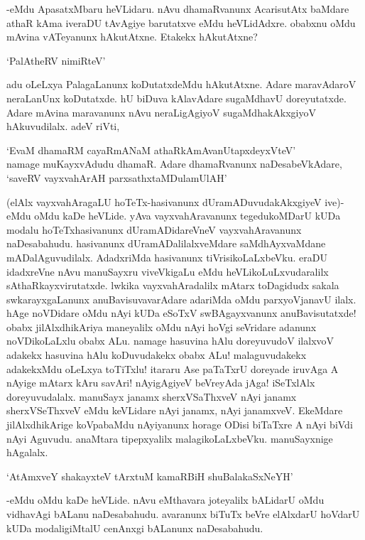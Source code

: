 -eMdu ApasatxMbaru heVLidaru. nAvu dhamaRvanunx AcarisutAtx baMdare athaR kAma iveraDU tAvAgiye barutatxve eMdu heVLidAdxre. obabxnu oMdu mAvina vATeyanunx hAkutAtxne. Etakekx hAkutAtxne?

\begin{shloka}
`PalAtheRV nimiRteV'
\end{shloka}

adu oLeLxya PalagaLanunx koDutatxdeMdu hAkutAtxne. Adare maravAdaroV neraLanUnx koDutatxde. hU biDuva kAlavAdare sugaMdhavU doreyutatxde. Adare mAvina maravanunx nAvu neraLigAgiyoV sugaMdhakAkxgiyoV hAkuvudilalx. adeV riVti,

\begin{shloka}
`EvaM dhamaRM cayaRmANaM athaRkAmAvanUtapxdeyxVteV'\\
namage muKayxvAdudu dhamaR. Adare dhamaRvanunx naDesabeVkAdare,\\
`saveRV vayxvahArAH parxsathxtaMDulamUlAH'
\end{shloka}

(elAlx vayxvahAragaLU hoTeTx-hasivanunx dUramADuvudakAkxgiyeV ive)- eMdu oMdu kaDe heVLide. yAva vayxvahAravanunx tegedukoMDarU kUDa modalu hoTeTxhasivanunx dUramADidareVneV vayxvahAravanunx naDesabahudu. hasivanunx dUramADalilalxveMdare saMdhAyxvaMdane mADalAguvudilalx. AdadxriMda hasivanunx tiVrisikoLaLxbeVku. eraDU idadxreVne nAvu manuSayxru viveVkigaLu eMdu heVLikoLuLxvudaralilx sAthaRkayxvirutatxde. lwkika vayxvahAradalilx mAtarx toDagidudx sakala swkarayxgaLanunx anuBavisuvavarAdare adariMda oMdu parxyoVjanavU ilalx. hAge noVDidare oMdu nAyi kUDa eSoTxV swBAgayxvanunx anuBavisutatxde! obabx jilAlxdhikAriya maneyalilx oMdu nAyi hoVgi seVridare adanunx noVDikoLaLxlu obabx ALu. namage hasuvina hAlu doreyuvudoV ilalxvoV adakekx hasuvina hAlu koDuvudakekx obabx ALu! malaguvudakekx adakekxMdu oLeLxya toTiTxlu! itararu Ase paTaTxrU doreyade iruvAga A nAyige mAtarx kAru savAri! nAyigAgiyeV beVreyAda jAga! iSeTxlAlx doreyuvudalalx. manuSayx janamx sherxVSaThxveV nAyi janamx sherxVSeThxveV eMdu keVLidare nAyi janamx, nAyi janamxveV. EkeMdare jilAlxdhikArige koVpabaMdu nAyiyanunx horage ODisi biTaTxre A nAyi biVdi nAyi Aguvudu. anaMtara tipepxyalilx malagikoLaLxbeVku. manuSayxnige hAgalalx.

\begin{shloka}
`AtAmxveY shakayxteV tArxtuM kamaRBiH shuBalakaSxNeYH'
\end{shloka}

-eMdu oMdu kaDe heVLide. nAvu eMthavara joteyalilx bALidarU oMdu vidhavAgi bALanu naDesabahudu. avaranunx biTuTx beVre elAlxdarU hoVdarU kUDa modaligiMtalU cenAnxgi bALanunx naDesabahudu.

